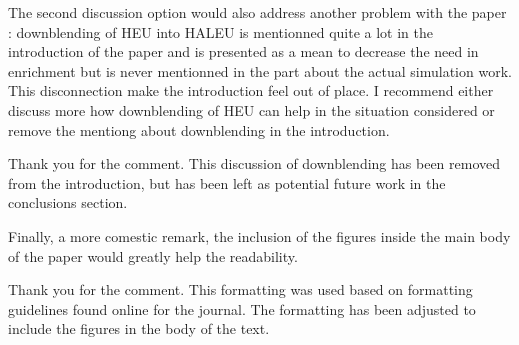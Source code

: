 \documentclass[answers,11pt]{exam}
\begin{document}
\begin{questions}
        \question The second discussion option would also address another problem 
        with the paper : downblending of HEU into HALEU is mentionned quite a lot 
        in the introduction of the paper and is presented as a mean to decrease 
        the need in enrichment but is never mentionned in the part about the actual 
        simulation work. This disconnection make the introduction feel out of place.
        I recommend either discuss more how downblending of HEU can help in the 
        situation considered or remove the mentiong about downblending in the 
        introduction.
        \begin{solution}
                Thank you for the comment. This discussion of downblending has been 
                removed from the introduction, but has been left as potential future 
                work in the conclusions section. 
        \end{solution}
        
        \question Finally, a more comestic remark, the inclusion of the figures 
        inside the main body of the paper would greatly help the readability.

        \begin{solution}
        	Thank you for the comment. This formatting was used based on 
                formatting guidelines found online for the journal. The formatting 
                has been adjusted to include the figures in the body of the text. 

        \end{solution}
\end{questions}
\end{document}
